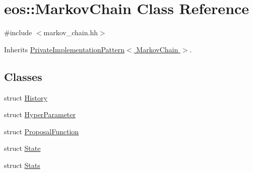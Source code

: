 \hypertarget{classeos_1_1MarkovChain}{
\section{eos::MarkovChain Class Reference}
\label{classeos_1_1MarkovChain}
}


{\ttfamily \#include $<$markov\_\-chain.hh$>$}

Inherits \hyperlink{classeos_1_1PrivateImplementationPattern}{PrivateImplementationPattern$<$ MarkovChain $>$}.\subsection*{Classes}
\begin{DoxyCompactItemize}
\item 
struct \hyperlink{structeos_1_1MarkovChain_1_1History}{History}
\item 
struct \hyperlink{structeos_1_1MarkovChain_1_1HyperParameter}{HyperParameter}
\item 
struct \hyperlink{structeos_1_1MarkovChain_1_1ProposalFunction}{ProposalFunction}
\item 
struct \hyperlink{structeos_1_1MarkovChain_1_1State}{State}
\item 
struct \hyperlink{structeos_1_1MarkovChain_1_1Stats}{Stats}
\end{DoxyCompactItemize}
